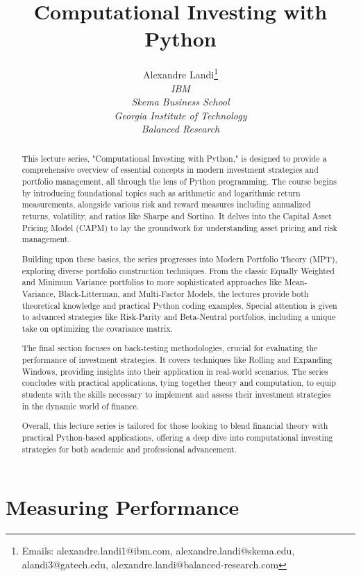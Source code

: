 \documentclass{article}
\title{Computational Investing with Python}
\author{Alexandre Landi\thanks{Emails: alexandre.landi1@ibm.com,
alexandre.landi@skema.edu,
alandi3@gatech.edu,
alexandre.landi@balanced-research.com} \\
    \textit{IBM} \\
    \textit{Skema Business School} \\
    \textit{Georgia Institute of Technology} \\
    \textit{Balanced Research} }
\begin{document}
\maketitle

\begin{abstract}
This lecture series, "Computational Investing with Python," is designed to provide a comprehensive overview of essential concepts in modern investment strategies and portfolio management, all through the lens of Python programming. The course begins by introducing foundational topics such as arithmetic and logarithmic return measurements, alongside various risk and reward measures including annualized returns, volatility, and ratios like Sharpe and Sortino. It delves into the Capital Asset Pricing Model (CAPM) to lay the groundwork for understanding asset pricing and risk management.

Building upon these basics, the series progresses into Modern Portfolio Theory (MPT), exploring diverse portfolio construction techniques. From the classic Equally Weighted and Minimum Variance portfolios to more sophisticated approaches like Mean-Variance, Black-Litterman, and Multi-Factor Models, the lectures provide both theoretical knowledge and practical Python coding examples. Special attention is given to advanced strategies like Risk-Parity and Beta-Neutral portfolios, including a unique take on optimizing the covariance matrix.

The final section focuses on back-testing methodologies, crucial for evaluating the performance of investment strategies. It covers techniques like Rolling and Expanding Windows, providing insights into their application in real-world scenarios. The series concludes with practical applications, tying together theory and computation, to equip students with the skills necessary to implement and assess their investment strategies in the dynamic world of finance.

Overall, this lecture series is tailored for those looking to blend financial theory with practical Python-based applications, offering a deep dive into computational investing strategies for both academic and professional advancement.
\end{abstract}

\tableofcontents
\clearpage

\section{Measuring Performance}
\end{document}
